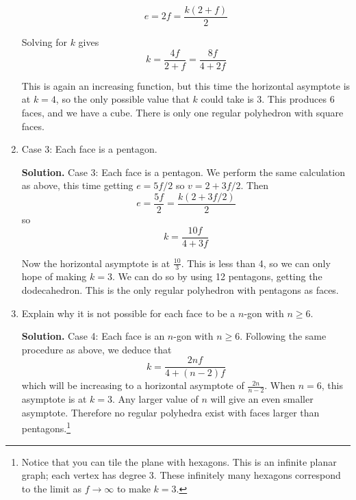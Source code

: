 \documentclass{book}
\begin{document}
\begin{activity}[]
\begin{enumerate}[font=\bfseries,label=(\alph*),ref=\alph*]
\begin{equation*}
e = 2f = \frac{k(2+f)}{2}
\end{equation*}
%
\par
\hypertarget{p-344}{}%
Solving for \(k\) gives%
\begin{equation*}
k = \frac{4f}{2+f} = \frac{8f}{4+2f}
\end{equation*}
%
\par
\hypertarget{p-345}{}%
This is again an increasing function, but this time the horizontal asymptote is at \(k = 4\), so the only possible value that \(k\) could take is 3. This produces 6 faces, and we have a cube. There is only one regular polyhedron with square faces.%
\item\label{task-49} \hypertarget{p-346}{}%
Case 3: Each face is a pentagon.%
\par\smallskip%
\noindent\textbf{Solution.}\hypertarget{solution-34}{}\quad%
\hypertarget{p-347}{}%
Case 3: Each face is a pentagon. We perform the same calculation as above, this time getting \(e = 5f/2\) so \(v = 2 + 3f/2\). Then%
\begin{equation*}
e = \frac{5f}{2} = \frac{k(2+3f/2)}{2}
\end{equation*}
so%
\begin{equation*}
k = \frac{10f}{4+3f}
\end{equation*}
%
\par
\hypertarget{p-348}{}%
Now the horizontal asymptote is at \(\frac{10}{3}\). This is less than 4, so we can only hope of making \(k = 3\). We can do so by using 12 pentagons, getting the dodecahedron. This is the only regular polyhedron with pentagons as faces.%
\item\label{task-50} \hypertarget{p-349}{}%
Explain why it is not possible for each face to be a \(n\)-gon with \(n \ge 6\).%
\par\smallskip%
\noindent\textbf{Solution.}\hypertarget{solution-35}{}\quad%
\hypertarget{p-350}{}%
Case 4: Each face is an \(n\)-gon with \(n \ge 6\). Following the same procedure as above, we deduce that%
\begin{equation*}
k = \frac{2nf}{4+(n-2)f}
\end{equation*}
which will be increasing to a horizontal asymptote of \(\frac{2n}{n-2}\). When \(n = 6\), this asymptote is at \(k = 3\). Any larger value of \(n\) will give an even smaller asymptote. Therefore no regular polyhedra exist with faces larger than pentagons.\footnote{Notice that you can tile the plane with hexagons.  This is an infinite planar graph; each vertex has degree 3.  These infinitely many hexagons correspond to the limit as \(f \to \infty\) to make \(k = 3\).\label{fn-4}}%
\end{enumerate}
\end{activity}
\end{document}
